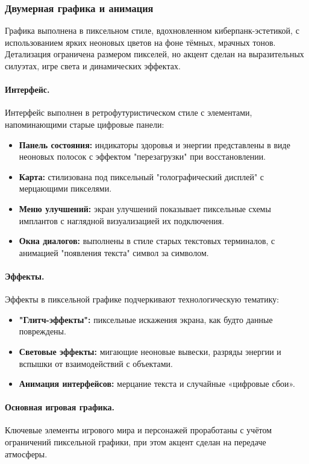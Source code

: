 \documentclass{article}
\begin{document}
\begin{itemize}
\subsubsection{Двумерная графика и анимация}

Графика выполнена в пиксельном стиле, вдохновленном киберпанк-эстетикой, с использованием ярких неоновых цветов на фоне тёмных, мрачных тонов. Детализация ограничена размером пикселей, но акцент сделан на выразительных силуэтах, игре света и динамических эффектах.

\paragraph{Интерфейс.}
Интерфейс выполнен в ретрофутуристическом стиле с элементами, напоминающими старые цифровые панели:
\begin{itemize}
    \item \textbf{Панель состояния:} индикаторы здоровья и энергии представлены в виде неоновых полосок с эффектом "перезагрузки" при восстановлении.
    \item \textbf{Карта:} стилизована под пиксельный "голографический дисплей" с мерцающими пикселями.
    \item \textbf{Меню улучшений:} экран улучшений показывает пиксельные схемы имплантов с наглядной визуализацией их подключения.
    \item \textbf{Окна диалогов:} выполнены в стиле старых текстовых терминалов, с анимацией "появления текста" символ за символом.
\end{itemize}

\paragraph{Эффекты.}
Эффекты в пиксельной графике подчеркивают технологическую тематику:
\begin{itemize}
    \item \textbf{"Глитч-эффекты":} пиксельные искажения экрана, как будто данные повреждены.
    \item \textbf{Световые эффекты:} мигающие неоновые вывески, разряды энергии и вспышки от взаимодействий с объектами.
    \item \textbf{Анимация интерфейсов:} мерцание текста и случайные «цифровые сбои».
\end{itemize}

\paragraph{Основная игровая графика.}
Ключевые элементы игрового мира и персонажей проработаны с учётом ограничений пиксельной графики, при этом акцент сделан на передаче атмосферы.


\end{itemize}
\end{document}
